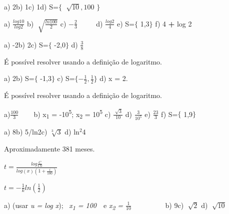 \begin{respostas}{5}

	\ansitem{} a) 2\quad \quad b) 1\quad \quad c) 1\quad \quad d) S=$ \{ $  \( \sqrt[]{10},100 \) $ \} $ 

    \ansitem{} a)  \( \frac{log10}{log2} \) \quad b)  \( \sqrt[]{\frac{ln100}{2}} \) \quad c)  \( -\frac{2}{3} \) \quad ~~~~ d)  \( \frac{log2}{4} \) \quad e) S=$ \{ $ 1,3$ \} $ \quad f) 4 \textbf{+} log 2

    \ansitem{} a) -2\quad \quad b) 2\quad \quad c) S=$ \{ $ -2,0$ \} $ \quad d)  \( \frac{3}{8} \) 

    \ansitem{} É possível resolver usando a definição de logaritmo.

    \ansitem{} a) 2\quad \quad b) S=$ \{ $ -1,3$ \} $ \quad c) S=$ \{ -\frac{1}{2}, \frac{1}{2} \}$  \quad d) x = 2. \quad

    \ansitem{} É possível resolver usando a definição de logaritmo.

    \ansitem{} a)$ \frac{100}{3} $ \quad ~~~ b) x\textsubscript{1} = -10\textsuperscript{5}; x\textsubscript{2} = 10\textsuperscript{5}   \quad c)  \( \frac{\sqrt[]{3}}{10}\) \quad d)  \( \frac{3}{10^{5}} \) \quad \quad e)  \( \frac{23}{3} \) \quad \quad f) S=$ \{ $ 1,9$ \} $ 

    \ansitem{} a) 8\quad \quad b) 5/ln2\quad c)  \( \sqrt[3]{3} \) \quad \quad d) ln$^2$4

    \ansitem{} Aproximadamente 381 meses.

    \ansitem{} \( t= \frac{log\frac{C}{C0}}{log(x) \left( 1+\frac{i}{100} \right) } \)

    \ansitem{} \( t= -\frac{1}{k}ln \left( \frac{1}{2} \right)  \) 

    \ansitem{} a) (usar \textit{u = log x});~ \textit{x\textsubscript{1} = 100}~~e  \textit{x\textsubscript{2} = $\frac{1}{10}$}~~~~~~~~~ b) 9\quad \quad c)  \( \sqrt[]{2} \) \quad \quad d)  \( \sqrt[]{10} \) 
\end{respostas}


